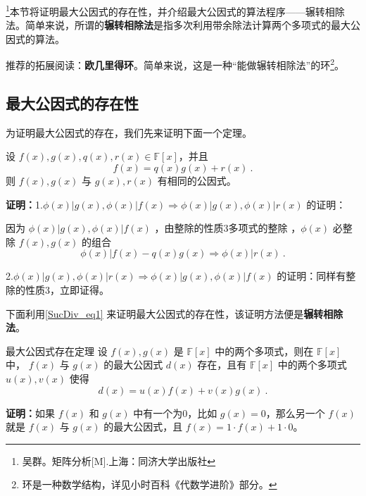 
\begin{issues}
\end{issues}
\footnote{吴群。矩阵分析[M].上海：同济大学出版社}本节将证明最大公因式的存在性，并介绍最大公因式的算法程序——辗转相除法。简单来说，所谓的\textbf{辗转相除法}是指多次利用带余除法计算两个多项式的最大公因式的算法。


推荐的拓展阅读：\textbf{欧几里得环}。简单来说，这是一种“能做辗转相除法”的环\footnote{环是一种数学结构，详见小时百科《代数学进阶》部分。}。


\subsection{最大公因式的存在性}
为证明最大公因式的存在，我们先来证明下面一个定理。
\begin{theorem}{}\label{SucDiv_the1}
设 $f(x),g(x),q(x),r(x)\in\mathbb{F}[x]$，并且
\begin{equation}\label{SucDiv_eq1}
f(x)=q(x)g(x)+r(x)~.
\end{equation}
则 $f(x),g(x)$ 与 $g(x),r(x)$ 有相同的公因式。
\end{theorem}
\textbf{证明：}1.$\phi(x)|g(x),\phi(x)|f(x)\Rightarrow \phi(x)|g(x),\phi(x)|r(x)$ 的证明：

因为 $\phi(x)|g(x),\phi(x)|f(x)$ ，由整除的性质3多项式的整除 ，$\phi(x)$ 必整除 $f(x),g(x)$ 的组合
\begin{equation}
\phi(x)|f(x)-q(x)g(x)\Rightarrow \phi(x)|r(x)~.
\end{equation}

2.$\phi(x)|g(x),\phi(x)|r(x)\Rightarrow\phi(x)|g(x),\phi(x)|f(x)$ 的证明：同样有整除的性质3，立即证得。

下面利用\autoref{SucDiv_eq1} 来证明最大公因式的存在性，该证明方法便是\textbf{辗转相除法}。
\begin{theorem}{最大公因式存在定理}\label{SucDiv_the2}
设 $f(x),g(x)$ 是 $\mathbb{F}[x]$ 中的两个多项式，则在 $\mathbb{F}[x]$ 中， $f(x)$ 与 $g(x)$ 的最大公因式 $d(x)$ 存在，且有 $\mathbb{F}[x]$ 中的两个多项式 $u(x),v(x)$ 使得
\begin{equation}\label{SucDiv_eq2}
d(x)=u(x)f(x)+v(x)g(x)~.
\end{equation}

\end{theorem}
\textbf{证明：}如果 $f(x)$ 和 $g(x)$ 中有一个为0，比如 $g(x)=0$，那么另一个 $f(x)$ 就是 $f(x)$ 与 $g(x)$ 的最大公因式，且 $f(x)=1\cdot f(x)+1\cdot0$。

